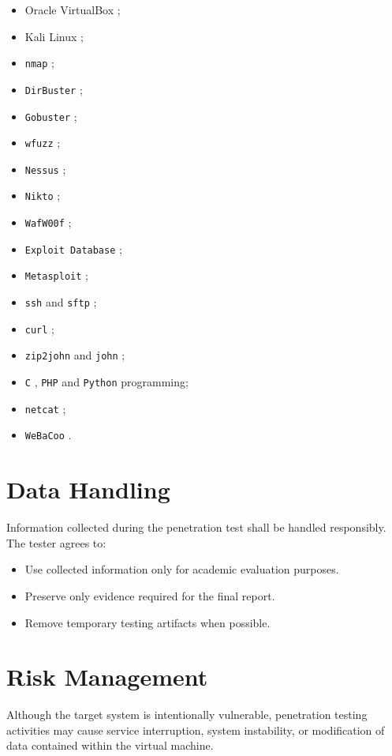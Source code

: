 \begin{itemize}
	\item Oracle VirtualBox \cite{virtualbox};
	\item Kali Linux \cite{kali};
    \item \texttt{nmap} \cite{nmap};
    \item \texttt{DirBuster} \cite{dirbuster};
    \item \texttt{Gobuster} \cite{gobuster};
    \item \texttt{wfuzz} \cite{wfuzz};
    \item \texttt{Nessus} \cite{nessus};
    \item \texttt{Nikto} \cite{nikto};
    \item \texttt{WafW00f} \cite{wafwoof};
    \item \texttt{Exploit Database} \cite{exploitdb};
    \item \texttt{Metasploit} \cite{metasploitMetasploitPenetration};
    \item \texttt{ssh} and \texttt{sftp} \cite{ssh};
    \item \texttt{curl} \cite{curl};
    \item \texttt{zip2john} and \texttt{john} \cite{john};
    \item \texttt{C} \cite{c}, \texttt{PHP} \cite{php} and \texttt{Python} \cite{python} programming;
    \item \texttt{netcat} \cite{netcat};
    \item \texttt{WeBaCoo} \cite{webacoo}.
\end{itemize}

\section{Data Handling}
Information collected during the penetration test shall be handled responsibly.
\\

The tester agrees to:

\begin{itemize}
    \item Use collected information only for academic evaluation purposes.
    \item Preserve only evidence required for the final report.
    \item Remove temporary testing artifacts when possible.
\end{itemize}

\section{Risk Management}
Although the target system is intentionally vulnerable, penetration testing
activities may cause service interruption, system instability, or modification
of data contained within the virtual machine.
\\

